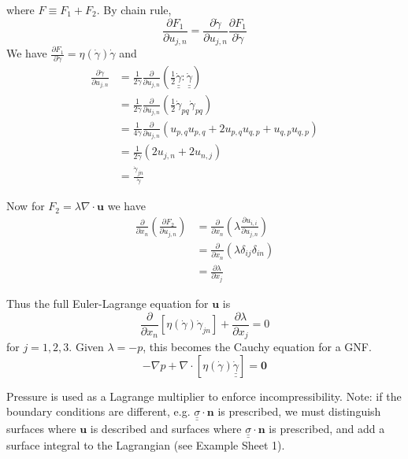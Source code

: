 \documentclass{jknotes}
\newcommand{\dunder}[1]{\underline{\underline{#1}}}
\newcommand{\srate}{\dot{\gamma}}
\begin{document}
where $F \equiv F_1 + F_2$. By chain rule, 
\begin{equation}
	\frac{\partial F_1}{\partial u_{j,n}} = \frac{\partial \srate}{\partial
	u_{j,n}} \frac{\partial F_1}{\partial \srate}
\end{equation}
We have $\frac{\partial F_1}{\partial \srate} = \eta(\srate) \srate$ and
\begin{align}
	\frac{\partial \srate}{\partial u_{j,n}} &=
	\frac{1}{2\srate} \frac{\partial}{\partial u_{j,n}} \left( \frac{1}{2}
	\dunder{\srate}:\dunder{\srate}\right) \\
	&= \frac{1}{2\srate} \frac{\partial}{\partial u_{j,n}} \left( \frac{1}{2}
	\srate_{pq} \srate_{pq}\right) \\
	&= \frac{1}{4\srate} \frac{\partial}{\partial u_{j,n}}\left(
u_{p,q}u_{p,q} + 2u_{p,q}u_{q,p} + u_{q,p}u_{q,p}\right) \\
&= \frac{1}{2\srate} \left( 2 u_{j,n} + 2u_{n,j}\right) \\
&= \frac{\srate_{jn}}{\srate}
\end{align}

Now for $F_2 = \lambda \nabla \cdot \bm{u}$ we have
\begin{align}
	\frac{\partial}{\partial x_n} \left( \frac{\partial F_2}{\partial u_{j,n}}
		\right) &= \frac{\partial}{\partial x_n} \left( \lambda
		\frac{\partial u_{i,i}}{\partial u_{j,n}}
	\right) \\
	&= \frac{\partial}{\partial x_n} \left( \lambda \delta_{ij}
\delta_{in}\right) \\
&= \frac{\partial \lambda}{\partial x_j}
\end{align}

Thus the full Euler-Lagrange equation for $\bm{u}$ is
\begin{equation}
	\frac{\partial}{\partial x_n} \left[ \eta(\srate) \srate_{jn}\right] +
	\frac{\partial \lambda}{\partial x_j} = 0
\end{equation}
for $j= 1, 2, 3$. Given $\lambda = -p$, this becomes the Cauchy equation for a
GNF.
\begin{equation}
	-\nabla p + \nabla \cdot \left[ \eta(\srate) \dunder{\srate}\right] =
	\bm{0}
\end{equation}

Pressure is used as a Lagrange multiplier to enforce incompressibility. Note:
if the boundary conditions are different, e.g. $\dunder{\sigma} \cdot \bm{n}$
is prescribed, we must distinguish surfaces where $\bm{u}$ is described and
surfaces where $\dunder{\sigma} \cdot \bm{n}$ is prescribed, and add a surface
integral to the Lagrangian (see Example Sheet 1).
\end{document}
